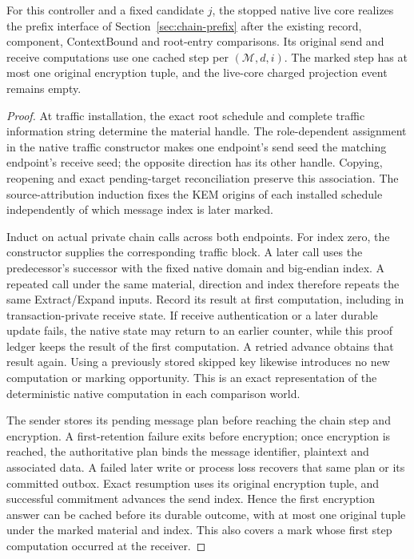 \begin{lemma}
\label{lem:native-online-chain-correspondence}
For this controller and a fixed candidate $j$, the stopped native live
core realizes the prefix interface of Section~\ref{sec:chain-prefix}
after the existing record, component, ContextBound and root-entry
comparisons. Its original send and receive computations use one cached
step per $(\mathcal M,d,i)$. The marked step has at most one original
encryption tuple, and the live-core charged projection event remains
empty.
\end{lemma}
\begin{proof}
At traffic installation, the exact root schedule and complete traffic
information string determine the material handle. The role-dependent
assignment in the native traffic constructor makes one endpoint's
send seed the matching endpoint's receive seed; the opposite direction
has its other handle. Copying, reopening and exact pending-target
reconciliation preserve this association. The source-attribution
induction fixes the KEM origins of each installed schedule independently
of which message index is later marked.

Induct on actual private chain calls across both endpoints. For index
zero, the constructor supplies the corresponding traffic block. A
later call uses the predecessor's successor with the fixed native
domain and big-endian index. A repeated call under the same material,
direction and index therefore repeats the same Extract/Expand inputs.
Record its result at first computation, including in transaction-private
receive state. If receive authentication or a later durable update
fails, the native state may return to an earlier counter, while this
proof ledger keeps the result of the first computation. A retried advance
obtains that result again. Using a previously stored skipped key likewise
introduces no new computation or marking opportunity. This is an
exact representation of the deterministic native computation in
each comparison world.

The sender stores its pending message plan before reaching the chain
step and encryption. A first-retention failure exits before encryption;
once encryption is reached, the authoritative plan binds the message
identifier, plaintext and associated data. A failed later write or
process loss recovers that same plan or its committed outbox. Exact
resumption uses its original encryption tuple, and successful commitment
advances the send index. Hence the first encryption answer can be
cached before its durable outcome, with at most one original tuple
under the marked material and index. This also covers a mark whose
first step computation occurred at the receiver.


\end{proof}
